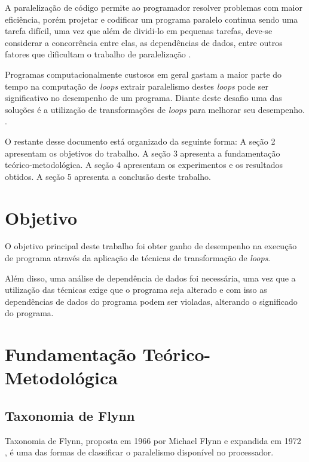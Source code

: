 \documentclass[12pt]{article}
\begin{document}
A paralelização de código permite ao programador resolver problemas com maior 
eficiência, porém projetar e codificar um programa paralelo continua sendo uma 
tarefa difícil, uma vez que além de dividi-lo em pequenas tarefas, deve-se 
considerar a concorrência entre elas, as dependências de dados, entre outros 
fatores que dificultam o trabalho de 
paralelização \cite{aipp}.

Programas computacionalmente custosos em geral gastam a maior parte do tempo na
computação de \textit{loops} extrair paralelismo destes \textit{loops} pode 
ser significativo no desempenho de um programa.
Diante deste desafio uma das soluções é a utilização de transformações de
\textit{loops} para melhorar seu desempenho.
\cite{hpcfpc}.

O restante desse documento está organizado da seguinte forma: 
A seção 2 apresentam os objetivos do trabalho.
A seção 3 apresenta a fundamentação teórico-metodológica.
A seção 4 apresentam os experimentos e os resultados obtidos. 
A seção 5 apresenta a conclusão deste trabalho.
\section{Objetivo}

O objetivo principal deste trabalho foi obter ganho de desempenho na execução 
de programa através da aplicação de técnicas de transformação de \textit{loops}.

Além disso, uma análise de dependência de dados foi necessária, uma vez que a 
utilização das técnicas exige que o programa seja alterado e
com isso as dependências de dados do programa podem ser violadas, alterando o 
significado do programa.

\section{Fundamentação Teórico-Metodológica}
\label{sec:fundamentacao}


\subsection{Taxonomia de Flynn}

Taxonomia de Flynn, proposta em 1966 \cite{Flynn:1966} por Michael 
Flynn e expandida em 1972 \cite{Flynn:1972}, é uma das formas de classificar o 
paralelismo disponível no processador.  
\end{document}
